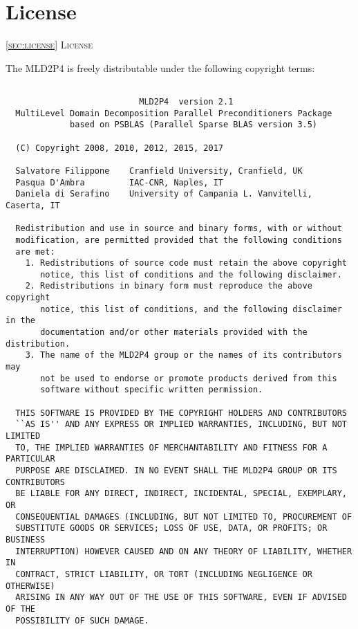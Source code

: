 \section{License\label{sec:license}}
         {\textsc{\ref{sec:license} License}}

The MLD2P4 is freely distributable under the following copyright
terms: {\small
\begin{verbatim} 
 
                           MLD2P4  version 2.1
  MultiLevel Domain Decomposition Parallel Preconditioners Package
             based on PSBLAS (Parallel Sparse BLAS version 3.5)
  
  (C) Copyright 2008, 2010, 2012, 2015, 2017

  Salvatore Filippone    Cranfield University, Cranfield, UK
  Pasqua D'Ambra         IAC-CNR, Naples, IT
  Daniela di Serafino    University of Campania L. Vanvitelli, Caserta, IT

  Redistribution and use in source and binary forms, with or without
  modification, are permitted provided that the following conditions
  are met:
    1. Redistributions of source code must retain the above copyright
       notice, this list of conditions and the following disclaimer.
    2. Redistributions in binary form must reproduce the above copyright
       notice, this list of conditions, and the following disclaimer in the
       documentation and/or other materials provided with the distribution.
    3. The name of the MLD2P4 group or the names of its contributors may
       not be used to endorse or promote products derived from this
       software without specific written permission.
 
  THIS SOFTWARE IS PROVIDED BY THE COPYRIGHT HOLDERS AND CONTRIBUTORS
  ``AS IS'' AND ANY EXPRESS OR IMPLIED WARRANTIES, INCLUDING, BUT NOT LIMITED
  TO, THE IMPLIED WARRANTIES OF MERCHANTABILITY AND FITNESS FOR A PARTICULAR
  PURPOSE ARE DISCLAIMED. IN NO EVENT SHALL THE MLD2P4 GROUP OR ITS CONTRIBUTORS
  BE LIABLE FOR ANY DIRECT, INDIRECT, INCIDENTAL, SPECIAL, EXEMPLARY, OR
  CONSEQUENTIAL DAMAGES (INCLUDING, BUT NOT LIMITED TO, PROCUREMENT OF
  SUBSTITUTE GOODS OR SERVICES; LOSS OF USE, DATA, OR PROFITS; OR BUSINESS
  INTERRUPTION) HOWEVER CAUSED AND ON ANY THEORY OF LIABILITY, WHETHER IN
  CONTRACT, STRICT LIABILITY, OR TORT (INCLUDING NEGLIGENCE OR OTHERWISE)
  ARISING IN ANY WAY OUT OF THE USE OF THIS SOFTWARE, EVEN IF ADVISED OF THE
  POSSIBILITY OF SUCH DAMAGE.
 
\end{verbatim}
}
